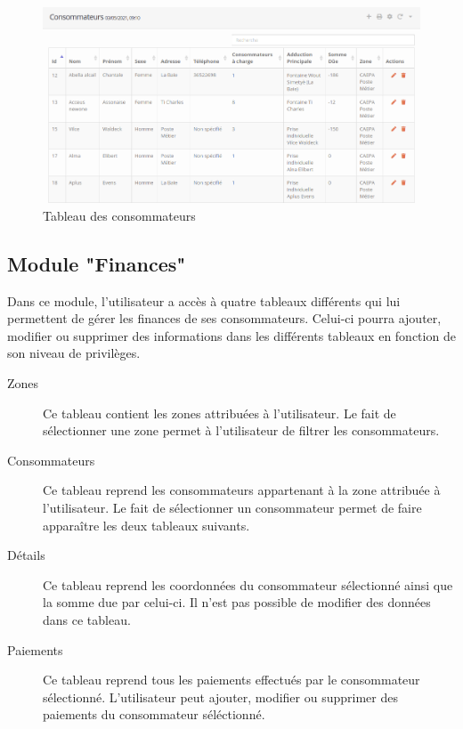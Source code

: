 \documentclass{EPL-master-thesis-covers-FR}
\begin{document}
				\begin{figure}[H]
					\centering
					\includegraphics[width=1\textwidth]{images/consumer_tab1}
					\caption{Tableau des consommateurs}
				\end{figure}
			

			\subsection{Module "Finances"}
				Dans ce module, l'utilisateur a accès à quatre tableaux différents qui lui permettent de gérer les finances de ses consommateurs. Celui-ci pourra ajouter, modifier ou supprimer des informations dans les différents tableaux en fonction de son niveau de privilèges.
				
				\begin{description}
					\item[Zones] Ce tableau contient les zones attribuées à l'utilisateur. Le fait de sélectionner une zone permet à l'utilisateur de filtrer les consommateurs.
					\item[Consommateurs] Ce tableau reprend les consommateurs appartenant à la zone attribuée à l'utilisateur. Le fait de sélectionner un consommateur permet de faire apparaître les deux tableaux suivants.
					\item[Détails] Ce tableau reprend les coordonnées du consommateur sélectionné ainsi que la somme due par celui-ci. Il n'est pas possible de modifier des données dans ce tableau.
					\item[Paiements] Ce tableau reprend tous les paiements effectués par le consommateur sélectionné. L'utilisateur peut ajouter, modifier ou supprimer des paiements du consommateur séléctionné.
				\end{description}
				
\end{document}
